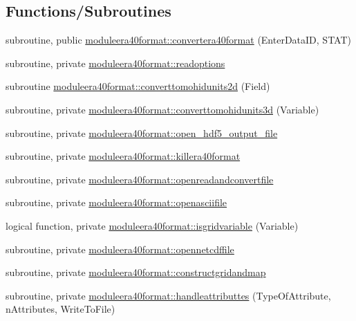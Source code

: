 \subsection*{Functions/\+Subroutines}
\begin{DoxyCompactItemize}
\item 
subroutine, public \mbox{\hyperlink{namespacemoduleera40format_a0ebf94dc06f2741d57181016580896b9}{moduleera40format\+::convertera40format}} (Enter\+Data\+ID, S\+T\+AT)
\item 
subroutine, private \mbox{\hyperlink{namespacemoduleera40format_a26224b66b1a9302c71025953c7303ed6}{moduleera40format\+::readoptions}}
\item 
subroutine \mbox{\hyperlink{namespacemoduleera40format_a4a4d9db2a785bd8a90d6860faf58c6bf}{moduleera40format\+::converttomohidunits2d}} (Field)
\item 
subroutine, private \mbox{\hyperlink{namespacemoduleera40format_a407d38960a0ddf8b9d1645d26d35d49b}{moduleera40format\+::converttomohidunits3d}} (Variable)
\item 
subroutine, private \mbox{\hyperlink{namespacemoduleera40format_a84aefcd4351fc116d22a21fdfce2ec4f}{moduleera40format\+::open\+\_\+hdf5\+\_\+output\+\_\+file}}
\item 
subroutine, private \mbox{\hyperlink{namespacemoduleera40format_aa8632d63af3434480b59776e3b58b294}{moduleera40format\+::killera40format}}
\item 
subroutine, private \mbox{\hyperlink{namespacemoduleera40format_ab03a5122cb83fd0b3153870ed6bf1cdc}{moduleera40format\+::openreadandconvertfile}}
\item 
subroutine, private \mbox{\hyperlink{namespacemoduleera40format_aeaa93e0eaf981081d8b6a42b94714211}{moduleera40format\+::openasciifile}}
\item 
logical function, private \mbox{\hyperlink{namespacemoduleera40format_a5d0edb2c39da4714b1bffb8a6c97b1a2}{moduleera40format\+::isgridvariable}} (Variable)
\item 
subroutine, private \mbox{\hyperlink{namespacemoduleera40format_a462785fbcd7874f4f3ab321366b79ec9}{moduleera40format\+::opennetcdffile}}
\item 
subroutine, private \mbox{\hyperlink{namespacemoduleera40format_ad4271c51cd4bfc71c5ed5743a60e7fef}{moduleera40format\+::constructgridandmap}}
\item 
subroutine, private \mbox{\hyperlink{namespacemoduleera40format_adaf25cab272ca9c6e2db6b1f641c0136}{moduleera40format\+::handleattributtes}} (Type\+Of\+Attribute, n\+Attributes, Write\+To\+File)

\end{DoxyCompactItemize}
